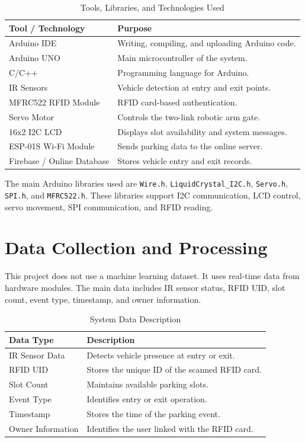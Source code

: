 \begin{table}[H]
\centering
\small
\caption{Tools, Libraries, and Technologies Used}
\label{tab:tools_technologies}
\begin{tabular}{p{4cm} p{8.5cm}}
\toprule
\textbf{Tool / Technology} & \textbf{Purpose} \\
\midrule
Arduino IDE & Writing, compiling, and uploading Arduino code. \\
Arduino UNO & Main microcontroller of the system. \\
C/C++ & Programming language for Arduino. \\
IR Sensors & Vehicle detection at entry and exit points. \\
MFRC522 RFID Module & RFID card-based authentication. \\
Servo Motor & Controls the two-link robotic arm gate. \\
16x2 I2C LCD & Displays slot availability and system messages. \\
ESP-01S Wi-Fi Module & Sends parking data to the online server. \\
Firebase / Online Database & Stores vehicle entry and exit records. \\
\bottomrule
\end{tabular}
\normalsize
\end{table}

The main Arduino libraries used are \texttt{Wire.h}, \texttt{LiquidCrystal\_I2C.h}, \texttt{Servo.h}, \texttt{SPI.h}, and \texttt{MFRC522.h}. These libraries support I2C communication, LCD control, servo movement, SPI communication, and RFID reading.

\section{Data Collection and Processing}

This project does not use a machine learning dataset. It uses real-time data from hardware modules. The main data includes IR sensor status, RFID UID, slot count, event type, timestamp, and owner information.

\begin{table}[H]
\centering
\small
\caption{System Data Description}
\label{tab:data_description}
\begin{tabular}{p{4cm} p{8.5cm}}
\toprule
\textbf{Data Type} & \textbf{Description} \\
\midrule
IR Sensor Data & Detects vehicle presence at entry or exit. \\
RFID UID & Stores the unique ID of the scanned RFID card. \\
Slot Count & Maintains available parking slots. \\
Event Type & Identifies entry or exit operation. \\
Timestamp & Stores the time of the parking event. \\
Owner Information & Identifies the user linked with the RFID card. \\
\bottomrule
\end{tabular}
\normalsize
\end{table}

